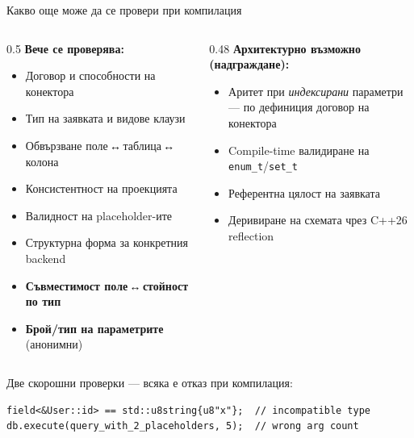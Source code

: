 \documentclass[aspectratio=169,12pt]{beamer}
\begin{document}
\begin{frame}[fragile]{Какво още може да се провери при компилация}
    \begin{columns}[T]
        \begin{column}{0.5\textwidth}
            \textbf{Вече се проверява:}
            \begin{itemize}\footnotesize
                \setlength{\itemsep}{0.05em}
                \item Договор и способности на конектора
                \item Тип на заявката и видове клаузи
                \item Обвързване поле\,↔\,таблица\,↔\,колона
                \item Консистентност на проекцията
                \item Валидност на placeholder-ите
                \item Структурна форма за конкретния backend
                \item \textbf{Съвместимост поле\,↔\,стойност по тип}
                \item \textbf{Брой/тип на параметрите} (анонимни)
            \end{itemize}
        \end{column}
        \begin{column}{0.48\textwidth}
            \textbf{Архитектурно възможно (надграждане):}
            \begin{itemize}\footnotesize
                \setlength{\itemsep}{0.05em}
                \item Аритет при \emph{индексирани} параметри \\ --- по дефиниция договор на конектора
                \item Compile-time валидиране на \texttt{enum\_t}/\texttt{set\_t}
                \item Референтна цялост на заявката
                \item Деривиране на схемата чрез C++26 reflection
            \end{itemize}
        \end{column}
    \end{columns}
    \vspace{0.05em}
    {\scriptsize Две скорошни проверки --- всяка е отказ при компилация:}
\begin{lstlisting}
field<&User::id> == std::u8string{u8"x"};  // incompatible type
db.execute(query_with_2_placeholders, 5);  // wrong arg count
\end{lstlisting}
\end{frame}
\end{document}
